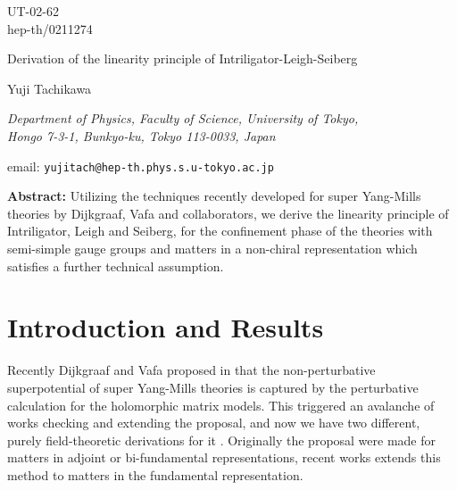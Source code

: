 \documentclass[a4paper,12pt]{article}
\def\W#1{W_{\text{#1}}}
\def\Nis{\mathcal{N}=}
\begin{document}
\thispagestyle{empty}
\hbox{}

\begin{flushright}
UT-02-62\\
hep-th/0211274
\end{flushright}

\bigskip\bigskip\bigskip
\bigskip\bigskip\bigskip

\begin{center}
\LARGE

Derivation of the linearity principle
of Intriligator-Leigh-Seiberg

\bigskip

{\Large
Yuji Tachikawa}\\

\normalsize
\bigskip

\textit{
Department of Physics, Faculty of Science, University of Tokyo,\\
Hongo 7-3-1, Bunkyo-ku, Tokyo 113-0033, Japan}

\bigskip

email: \texttt{yujitach@hep-th.phys.s.u-tokyo.ac.jp}
\end{center}

\textbf{Abstract:}
Utilizing the techniques recently developed
for \myHighlight{$\Nis1$}\coordHE{} super Yang-Mills theories
by Dijkgraaf, Vafa and collaborators, 
we derive the linearity principle of Intriligator, Leigh and Seiberg,
for the confinement phase of the theories
with semi-simple gauge groups and matters in a non-chiral representation
which satisfies a further technical assumption.


\newpage\setcounter{page}{1}
\section{Introduction and Results}
Recently Dijkgraaf and Vafa proposed
in \cite{Dijkgraaf:2002dh}
that the non-perturbative superpotential \myHighlight{$\W{eff}$}\coordHE{} of
\myHighlight{$\Nis1$}\coordHE{} super Yang-Mills theories is captured by
the perturbative calculation for the holomorphic matrix models.
This triggered an avalanche of works \cite{CHECKS} checking 
and extending the proposal, and now we have two different,
purely field-theoretic
derivations for it \cite{Dijkgraaf:2002xd} \cite{Cachazo:2002ry}.
Originally the proposal were made for matters in adjoint or bi-fundamental
representations, recent works \cite{Flavors} extends this method
to matters in the fundamental representation.
\end{document}
